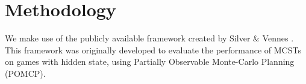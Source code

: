 
\section{Methodology}
We make use of the publicly available framework created by Silver \& Vennes \cite{silver2010monte}. This framework was originally developed to evaluate the performance of MCSTs on games with hidden state, using Partially Observable Monte-Carlo Planning (POMCP).
